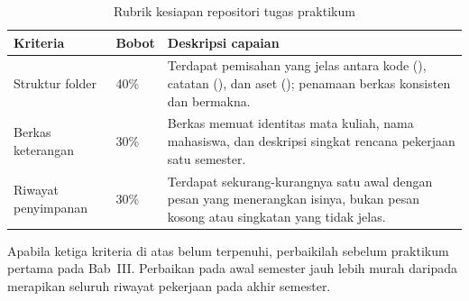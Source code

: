 \begin{table}[htbp]
\centering
\caption{Rubrik kesiapan repositori tugas praktikum}
\label{tab:rubrik-repositori}
{\setlength{\tabcolsep}{4pt}\footnotesize%
\begin{tabularx}{\textwidth}{@{}L{3.9cm} C{1.5cm} Y@{}}
\toprule
\headrow \textbf{Kriteria} & \textbf{Bobot} & \textbf{Deskripsi capaian} \\
\midrule
Struktur folder & 40\% &
Terdapat pemisahan yang jelas antara kode (), catatan
(), dan aset (); penamaan berkas konsisten dan
bermakna. \\
\addlinespace
Berkas keterangan & 30\% &
Berkas  memuat identitas mata kuliah, nama mahasiswa, dan
deskripsi singkat rencana pekerjaan satu semester. \\
\addlinespace
Riwayat penyimpanan & 30\% &
Terdapat sekurang-kurangnya satu  awal dengan pesan yang
menerangkan isinya, bukan pesan kosong atau singkatan yang tidak jelas. \\
\bottomrule
\end{tabularx}}
\end{table}

\begin{catatabox}
Apabila ketiga kriteria di atas belum terpenuhi, perbaikilah sebelum
praktikum pertama pada Bab~III. Perbaikan pada awal semester jauh lebih murah
daripada merapikan seluruh riwayat pekerjaan pada akhir semester.
\end{catatabox}
